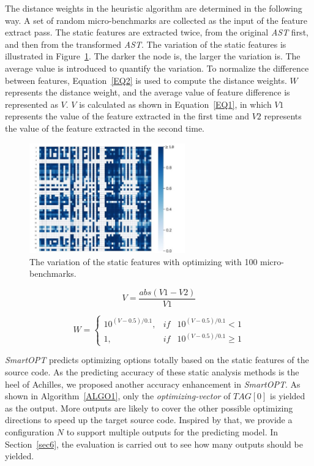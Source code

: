 \documentclass[bst/sn-mathphys]{sn-jnl}%
\theoremstyle{thmstyleone}%
\theoremstyle{thmstyletwo}%
\theoremstyle{thmstylethree}%
\begin{document}
The distance weights in the heuristic algorithm are determined in the 
following way. A set of random micro-benchmarks are collected as the input of 
the feature extract pass. The static features are extracted twice, from the 
original \emph{AST} first, and then from the transformed \emph{AST}. The 
variation of the static features is illustrated in Figure~\ref{FIG6}. The 
darker the node is, the larger the variation is. The average value is 
introduced to quantify the variation. To normalize the difference between 
features, Equation~\ref{EQ2} is used to compute the distance weights. $W$ 
represents 
the distance weight, and the average value of feature difference is represented 
as $V$. $V$ is calculated as shown in Equation~\ref{EQ1}, in which $V1$ 
represents 
the value of the feature extracted in the first time and $V2$ represents the 
value of the feature extracted in the second time.

\begin{figure}[h]%
\centering
\includegraphics[width=0.6\textwidth]{fig/fig6.pdf}
\caption{The variation of the static features with optimizing with 100 
micro-benchmarks.}\label{FIG6}
\end{figure}

\begin{equation}
	V=\frac{abs(V1-V2)}{V1} \label{EQ1}
\end{equation}


\begin{equation}
W=\left\{\begin{matrix}
10^{(V-0.5)/0.1},&if&10^{(V-0.5)/0.1} < 1 \\
1,&if&10^{(V-0.5)/0.1}\geqslant 1
\end{matrix}\right. \label{EQ2}
\end{equation}

\emph{SmartOPT} predicts optimizing options totally based on the static 
features of the source code. As the predicting accuracy of these static 
analysis methods is the heel of Achilles, we proposed another accuracy 
enhancement in \emph{SmartOPT}. As shown in Algorithm~\ref{ALGO1}, only the 
\emph{optimizing-vector} of $TAG[0]$ is yielded as the output. More outputs 
are likely to cover the other possible optimizing directions to speed up the 
target source code. Inspired by that, we provide a configuration $N$ to support 
multiple outputs for the predicting model. In Section~\ref{sec6}, the 
evaluation is carried out to see how many outputs should be yielded.
\end{document}
